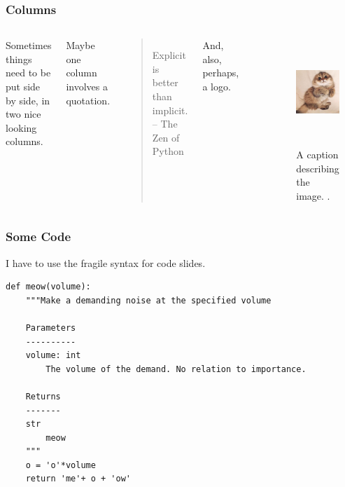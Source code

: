 \begin{frame}
  \frametitle{Columns}
        \begin{columns}
                \column[t]{5cm}
                Sometimes things need to be put side by side, in two nice 
                looking columns. 

                Maybe one column involves a quotation.

                \begin{quote}
                        Explicit is better than implicit. -- The Zen of Python
                \end{quote}


                And, also, perhaps, a logo.
                \begin{center}
                        \includegraphics[height=0.2\textheight]{./images/arfc-logo}
                \end{center}
                \column[t]{5cm}
        \begin{figure}[htbp!]
        \begin{center}
      \includegraphics[height=4cm]{./images/kitten}
    \end{center}
          \caption{A caption describing the image. \cite{lastname_firstword_1900}.}
    \label{fig:kittenfigure}
  \end{figure}
        \end{columns}
\end{frame}

\begin{frame}[fragile]
  \frametitle{Some Code}
        I have to use the fragile syntax for code slides.
        \begin{verbatim}
def meow(volume):
    """Make a demanding noise at the specified volume
    
    Parameters
    ----------
    volume: int
        The volume of the demand. No relation to importance.

    Returns
    -------
    str
        meow
    """
    o = 'o'*volume
    return 'me'+ o + 'ow'
\end{verbatim}
\end{frame}
